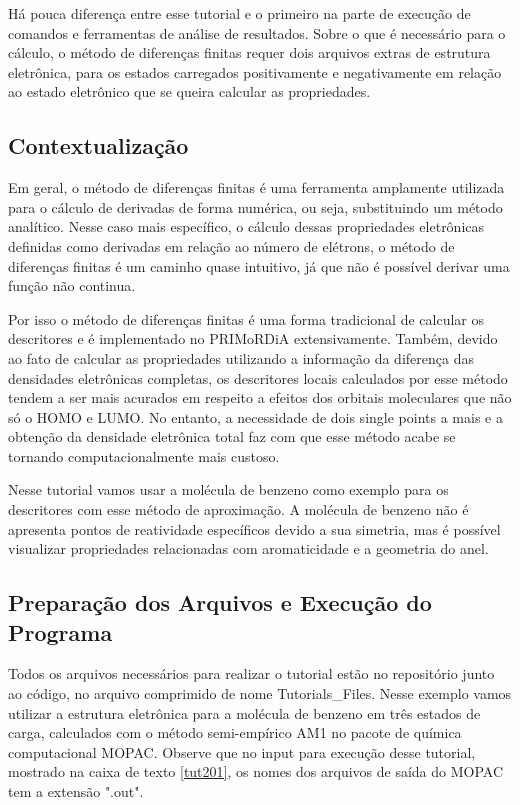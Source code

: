 \documentclass[a4paper,11pt]{refart}
\begin{document}
Há pouca diferença entre esse tutorial e o primeiro na parte de execução de comandos e ferramentas de análise de resultados. Sobre o que é necessário para o cálculo, o método de diferenças finitas requer dois arquivos extras de estrutura eletrônica, para os estados carregados positivamente e negativamente em relação ao estado eletrônico que se queira calcular as propriedades. 


\subsection{Contextualização}

Em geral, o método de diferenças finitas é uma ferramenta amplamente utilizada para o cálculo de derivadas de forma numérica, ou seja, substituindo um método analítico. Nesse caso mais específico, o cálculo dessas propriedades eletrônicas definidas como derivadas em relação ao número de elétrons, o método de diferenças finitas é um caminho quase intuitivo, já que não é possível derivar uma função não continua. 

Por isso o método de diferenças finitas é uma forma tradicional de calcular os descritores e é implementado no PRIMoRDiA extensivamente. Também, devido ao fato de calcular as propriedades utilizando a informação da diferença das densidades eletrônicas completas, os descritores locais calculados por esse método tendem a ser mais acurados em respeito a efeitos dos orbitais moleculares que não só o HOMO e LUMO. No entanto, a necessidade de dois single points a mais e a obtenção da densidade eletrônica total faz com que esse método acabe se tornando computacionalmente mais custoso. 

Nesse tutorial vamos usar a molécula de benzeno como exemplo para os descritores com esse método de aproximação. A molécula de benzeno não é apresenta pontos de reatividade específicos devido a sua simetria, mas é possível visualizar propriedades relacionadas com aromaticidade e a geometria do anel. 

\subsection{Preparação dos Arquivos e Execução do Programa}

Todos os arquivos necessários para realizar o tutorial estão no repositório junto ao código, no arquivo comprimido de nome Tutorials\_Files. Nesse exemplo vamos utilizar a estrutura eletrônica para a molécula de benzeno em três estados de carga, calculados com o método semi-empírico AM1 no pacote de química computacional MOPAC. Observe que no input para execução desse tutorial, mostrado na caixa de texto \autoref{tut201}, os nomes dos arquivos de saída do MOPAC tem a extensão ".out". 
\end{document}
